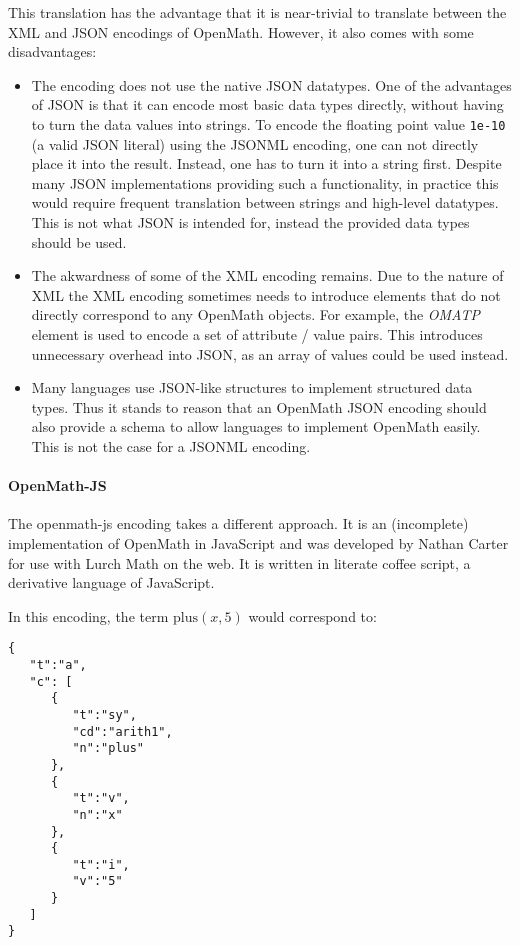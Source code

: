 This translation has the advantage that it is near-trivial to translate between the XML and JSON encodings of OpenMath. 
However, it also comes with some disadvantages:

\begin{itemize}
    \item The encoding does not use the native JSON datatypes. 
    One of the advantages of JSON is that it can encode most basic data types directly, without having to turn the data values into strings. 
    To encode the floating point value \lstinline{1e-10} (a valid JSON literal) using the JSONML encoding, one can not directly place it into the result. 
    Instead, one has to turn it into a string first.   
    Despite many JSON implementations providing such a functionality, in practice this would require frequent translation between strings and high-level datatypes.  
    This is not what JSON is intended for, instead the provided data types should be used. 

    \item The akwardness of some of the XML encoding remains. 
    Due to the nature of XML the XML encoding sometimes needs to introduce elements that do not directly correspond to any OpenMath objects. 
    For example, the \textit{OMATP} element is used to encode a set of attribute / value pairs. 
    This introduces unnecessary overhead into JSON, as an array of values could be used instead. 

    \item Many languages use JSON-like structures to implement structured data types. 
    Thus it stands to reason that an OpenMath JSON encoding should also provide a schema to allow languages to implement OpenMath easily. This is not the case for a JSONML encoding. 
\end{itemize}

\paragraph{OpenMath-JS}
The openmath-js  encoding takes a different approach. 
It is an (incomplete) implementation of OpenMath in JavaScript and was developed by Nathan Carter for use with Lurch Math on the web. 
It is written in literate coffee script, a derivative language of JavaScript. 

In this encoding, the term $\mathrm{plus}(x, 5)$ would correspond to: 
\begin{lstlisting}
{  
   "t":"a",
   "c": [  
      {  
         "t":"sy",
         "cd":"arith1",
         "n":"plus"
      },
      {  
         "t":"v",
         "n":"x"
      },
      {  
         "t":"i",
         "v":"5"
      }
   ]
}
\end{lstlisting}

